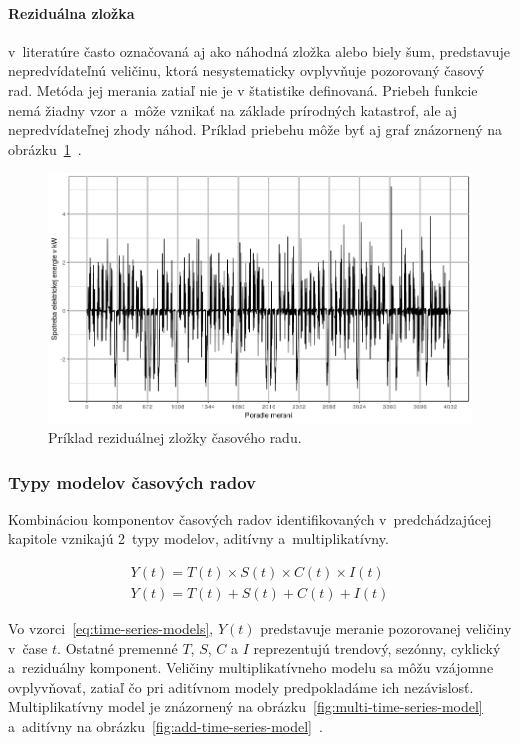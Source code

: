 \documentclass[a4paper,twoside,slovak,12pt,appendix]{article}
\begin{document}
\paragraph{Reziduálna zložka} v~literatúre často označovaná aj ako náhodná
zložka alebo biely šum, predstavuje nepredvídateľnú veličinu, ktorá
nesystematicky ovplyvňuje pozorovaný časový rad. Metóda jej merania zatiaľ nie
je v štatistike definovaná. Priebeh funkcie nemá žiadny vzor a~môže vznikať na
základe prírodných katastrof, ale aj nepredvídateľnej zhody náhod. Príklad
priebehu môže byť aj graf znázornený na
obrázku~\ref{fig:random-component}~\cite{Agrawal2013}.

\begin{figure}[H]
  \centering
  \includegraphics[width=\textwidth]{random_component.png}
  \caption{Príklad reziduálnej zložky časového radu.}
  \label{fig:random-component}
\end{figure}

\subsubsection{Typy modelov časových radov}
Kombináciou komponentov časových radov identifikovaných v~predchádzajúcej
kapitole vznikajú 2~typy modelov, aditívny a~multiplikatívny.

\begin{equation}
  \begin{split}
    Y(t) = T(t) \times S(t) \times C(t) \times I(t)
    \\
    Y(t) = T(t) + S(t) + C(t) + I(t)
  \end{split}
  \label{eq:time-series-models}
\end{equation}

Vo vzorci~\ref{eq:time-series-models}, $Y(t)$ predstavuje meranie pozorovanej
veličiny v~čase $t$. Ostatné premenné $T$, $S$, $C$ a $I$ reprezentujú trendový,
sezónny, cyklický a~reziduálny komponent. Veličiny multiplikatívneho modelu sa
môžu vzájomne ovplyvňovať, zatiaľ čo pri aditívnom modely predpokladáme ich
nezávislosť. Multiplikatívny model je znázornený na
obrázku~\ref{fig:multi-time-series-model} a~aditívny na
obrázku~\ref{fig:add-time-series-model}~\cite{Agrawal2013}.
\end{document}
